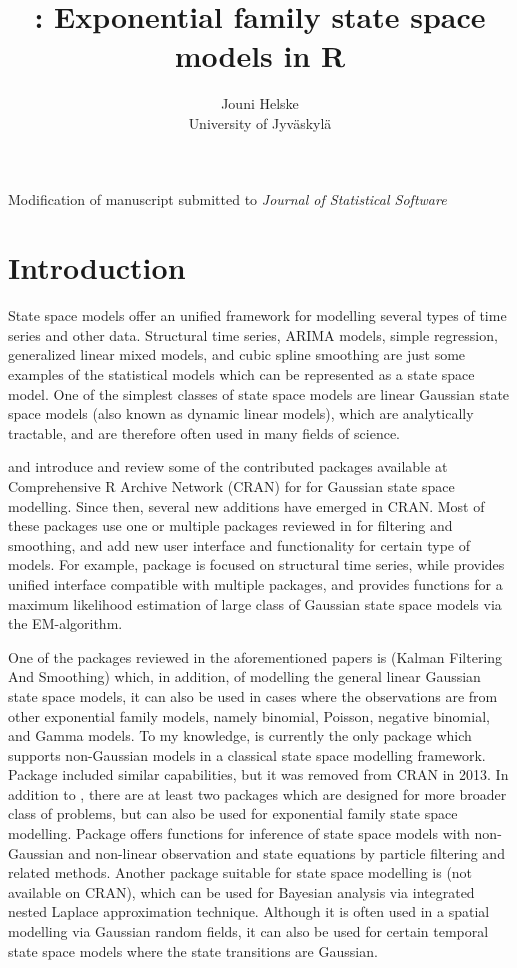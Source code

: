 \documentclass[nojss,article]{jss}\usepackage[]{graphicx}\usepackage[]{color}
\author{Jouni Helske\\ University of Jyv\"askyl\"a}
\title{\pkg{KFAS}: Exponential family state space models in R}
\begin{document}
Modification of manuscript submitted to \emph{Journal of Statistical Software}


\section{Introduction}

State space models offer an unified framework for modelling several types of time series and other data. Structural time series, ARIMA models, simple regression, generalized linear mixed models, and cubic spline smoothing are just some examples of the statistical models which can be represented as a state space model. One of the simplest classes of state space models are linear Gaussian state space models (also known as dynamic linear models), which are analytically tractable, and are therefore often used in many fields of science.

\citet{Petris2010} and \citet{Tusell2010} introduce and review some of the contributed packages available at Comprehensive R Archive Network (CRAN) for  \citep{R} for Gaussian state space modelling. Since then, several new additions have emerged in CRAN. Most of these packages use one or multiple packages reviewed in \citet{Tusell2010} for filtering and smoothing, and add new user interface and functionality for certain type of models. For example, package  \citep{rucm} is focused on structural time series, while  \citep{dlmodeler} provides unified interface compatible with multiple packages, and  \citep{MARSS,MARSSarticle} provides functions for a maximum likelihood estimation of large class of Gaussian state space models via the EM-algorithm.

One of the packages reviewed in the aforementioned papers is  (Kalman Filtering And Smoothing) which, in addition, of modelling the general linear Gaussian state space models, it can also be used in cases where the observations are from other exponential family models, namely binomial, Poisson, negative binomial, and Gamma models. To my knowledge,  is currently the only package which supports non-Gaussian models in a classical state space modelling framework. Package  \citep{sspir} included similar capabilities, but it was removed from CRAN in 2013. In addition to , there are at least two packages which are designed for more broader class of problems, but can also be used for exponential family state space modelling. Package  \citep{pomp} offers functions for inference of state space models with non-Gaussian and non-linear observation and state equations by particle filtering and related methods. Another package suitable for state space modelling is  \citep{inla} (not available on CRAN), which can be used for Bayesian analysis via integrated nested Laplace approximation technique. Although it is often used in a spatial modelling via Gaussian random fields, it can also be used for certain temporal state space models where the state transitions are Gaussian.
\end{document}
